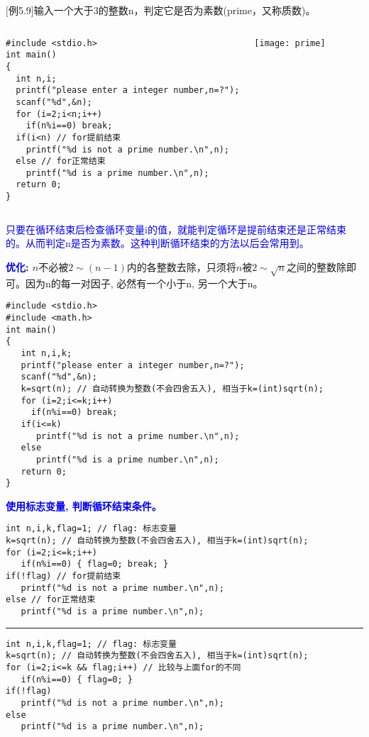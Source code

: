 \begin{frame}
\small
$[$例5.9$]$输入一个大于3的整数n，判定它是否为素数(prime，又称质数)。
\centering
\begin{columns}
\begin{lstlisting}
#include <stdio.h>
int main()
{
  int n,i;
  printf("please enter a integer number,n=?");
  scanf("%d",&n);
  for (i=2;i<n;i++)
    if(n%i==0) break;
  if(i<n) // for提前结束
    printf("%d is not a prime number.\n",n);
  else // for正常结束
    printf("%d is a prime number.\n",n);
  return 0;
}
\end{lstlisting}
	\texttt{[image: prime]}
\end{columns}
\textcolor{blue}{只要在循环结束后检查循环变量i的值，就能判定循环是提前结束还是正常结束的。从而判定n是否为素数。这种判断循环结束的方法以后会常用到。}
\end{frame}

\begin{frame}
\small
\textbf{\textcolor{blue}{优化: }} $n$不必被$2\sim (n-1)$内的各整数去除，只须将$n$被$2\sim\sqrt{n}$之间的整数除即可。因为n的每一对因子, 必然有一个小于n, 另一个大于n。
\begin{lstlisting}
#include <stdio.h>
#include <math.h>
int main()
{
   int n,i,k;
   printf("please enter a integer number,n=?");
   scanf("%d",&n);
   k=sqrt(n); // 自动转换为整数(不会四舍五入), 相当于k=(int)sqrt(n);
   for (i=2;i<=k;i++)
     if(n%i==0) break;
   if(i<=k) 
      printf("%d is not a prime number.\n",n);
   else 
      printf("%d is a prime number.\n",n);
   return 0;
}
\end{lstlisting}
\end{frame}

\begin{frame}
\small
\textbf{\textcolor{blue}{使用标志变量, 判断循环结束条件。}}
\begin{lstlisting}
int n,i,k,flag=1; // flag: 标志变量
k=sqrt(n); // 自动转换为整数(不会四舍五入), 相当于k=(int)sqrt(n);
for (i=2;i<=k;i++)
   if(n%i==0) { flag=0; break; }
if(!flag) // for提前结束
   printf("%d is not a prime number.\n",n);
else // for正常结束
   printf("%d is a prime number.\n",n);
\end{lstlisting}
\pause
\rule{\textwidth}{1pt} %
\begin{lstlisting}
int n,i,k,flag=1; // flag: 标志变量
k=sqrt(n); // 自动转换为整数(不会四舍五入), 相当于k=(int)sqrt(n);
for (i=2;i<=k && flag;i++) // 比较与上面for的不同
   if(n%i==0) { flag=0; }
if(!flag) 
   printf("%d is not a prime number.\n",n);
else 
   printf("%d is a prime number.\n",n);
\end{lstlisting}
\end{frame}


